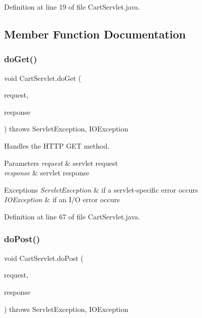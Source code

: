 Definition at line 19 of file Cart\+Servlet.\+java.



\subsection{Member Function Documentation}
\mbox{\label{class_cart_servlet_a79cf008fb01cd5bdf57b975bf9681ce9}} 
\subsubsection{\texorpdfstring{doGet()}{doGet()}}
{\footnotesize\ttfamily void Cart\+Servlet.\+do\+Get (\begin{DoxyParamCaption}\item[{Http\+Servlet\+Request}]{request,  }\item[{Http\+Servlet\+Response}]{response }\end{DoxyParamCaption}) throws Servlet\+Exception, I\+O\+Exception\hspace{0.3cm}{\ttfamily [protected]}}

Handles the H\+T\+TP {\ttfamily G\+ET} method.


\begin{DoxyParams}{Parameters}
{\em request} & servlet request \\
\hline
{\em response} & servlet response \\
\hline
\end{DoxyParams}

\begin{DoxyExceptions}{Exceptions}
{\em Servlet\+Exception} & if a servlet-\/specific error occurs \\
\hline
{\em I\+O\+Exception} & if an I/O error occurs \\
\hline
\end{DoxyExceptions}


Definition at line 67 of file Cart\+Servlet.\+java.

\mbox{\label{class_cart_servlet_ab95c46b660679a6fdc55fd5888ea2cfa}} 
\subsubsection{\texorpdfstring{doPost()}{doPost()}}
{\footnotesize\ttfamily void Cart\+Servlet.\+do\+Post (\begin{DoxyParamCaption}\item[{Http\+Servlet\+Request}]{request,  }\item[{Http\+Servlet\+Response}]{response }\end{DoxyParamCaption}) throws Servlet\+Exception, I\+O\+Exception\hspace{0.3cm}{\ttfamily [protected]}}

